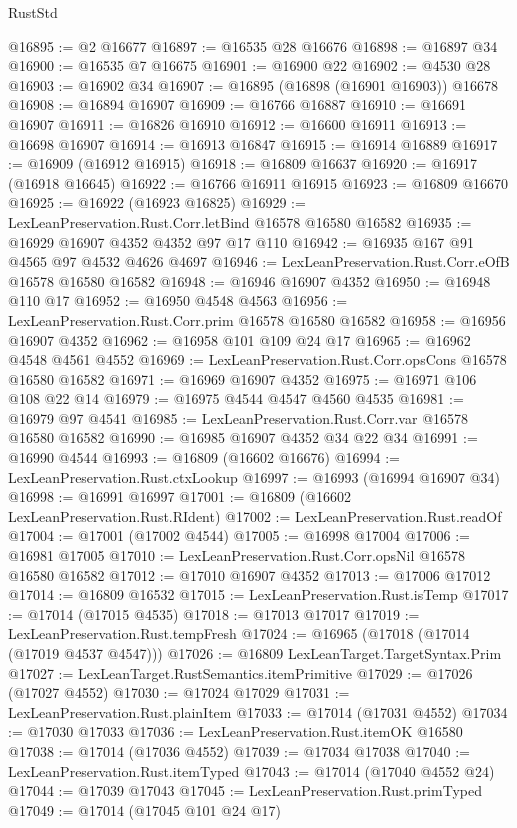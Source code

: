 \begin{lexlean}{RustStd}
\begin{coremodule}
@16895 := @2 @16677
@16897 := @16535 @28 @16676
@16898 := @16897 @34
@16900 := @16535 @7 @16675
@16901 := @16900 @22
@16902 := @4530 @28
@16903 := @16902 @34
@16907 := @16895 (@16898 (@16901 @16903)) @16678
@16908 := @16894 @16907
@16909 := @16766 @16887
@16910 := @16691 @16907
@16911 := @16826 @16910
@16912 := @16600 @16911
@16913 := @16698 @16907
@16914 := @16913 @16847
@16915 := @16914 @16889
@16917 := @16909 (@16912 @16915)
@16918 := @16809 @16637
@16920 := @16917 (@16918 @16645)
@16922 := @16766 @16911 @16915
@16923 := @16809 @16670
@16925 := @16922 (@16923 @16825)
@16929 := LexLeanPreservation.Rust.Corr.letBind @16578 @16580 @16582
@16935 := @16929 @16907 @4352 @4352 @97 @17 @110
@16942 := @16935 @167 @91 @4565 @97 @4532 @4626 @4697
@16946 := LexLeanPreservation.Rust.Corr.eOfB @16578 @16580 @16582
@16948 := @16946 @16907 @4352
@16950 := @16948 @110 @17
@16952 := @16950 @4548 @4563
@16956 := LexLeanPreservation.Rust.Corr.prim @16578 @16580 @16582
@16958 := @16956 @16907 @4352
@16962 := @16958 @101 @109 @24 @17
@16965 := @16962 @4548 @4561 @4552
@16969 := LexLeanPreservation.Rust.Corr.opsCons @16578 @16580 @16582
@16971 := @16969 @16907 @4352
@16975 := @16971 @106 @108 @22 @14
@16979 := @16975 @4544 @4547 @4560 @4535
@16981 := @16979 @97 @4541
@16985 := LexLeanPreservation.Rust.Corr.var @16578 @16580 @16582
@16990 := @16985 @16907 @4352 @34 @22 @34
@16991 := @16990 @4544
@16993 := @16809 (@16602 @16676)
@16994 := LexLeanPreservation.Rust.ctxLookup
@16997 := @16993 (@16994 @16907 @34)
@16998 := @16991 @16997
@17001 := @16809 (@16602 LexLeanPreservation.Rust.RIdent)
@17002 := LexLeanPreservation.Rust.readOf
@17004 := @17001 (@17002 @4544)
@17005 := @16998 @17004
@17006 := @16981 @17005
@17010 := LexLeanPreservation.Rust.Corr.opsNil @16578 @16580 @16582
@17012 := @17010 @16907 @4352
@17013 := @17006 @17012
@17014 := @16809 @16532
@17015 := LexLeanPreservation.Rust.isTemp
@17017 := @17014 (@17015 @4535)
@17018 := @17013 @17017
@17019 := LexLeanPreservation.Rust.tempFresh
@17024 := @16965 (@17018 (@17014 (@17019 @4537 @4547)))
@17026 := @16809 LexLeanTarget.TargetSyntax.Prim
@17027 := LexLeanTarget.RustSemantics.itemPrimitive
@17029 := @17026 (@17027 @4552)
@17030 := @17024 @17029
@17031 := LexLeanPreservation.Rust.plainItem
@17033 := @17014 (@17031 @4552)
@17034 := @17030 @17033
@17036 := LexLeanPreservation.Rust.itemOK @16580
@17038 := @17014 (@17036 @4552)
@17039 := @17034 @17038
@17040 := LexLeanPreservation.Rust.itemTyped
@17043 := @17014 (@17040 @4552 @24)
@17044 := @17039 @17043
@17045 := LexLeanPreservation.Rust.primTyped
@17049 := @17014 (@17045 @101 @24 @17)

\end{coremodule}
\end{lexlean}
